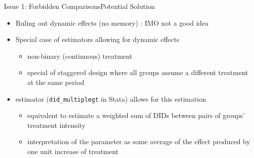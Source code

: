\documentclass{beamer}
\begin{document}
\begin{frame}{Issue 1: Forbidden Comparisons}{Potential Solution}
    

    \begin{itemize}
        \item Ruling out dynamic effects (no memory) \citep[][with quasi-stayers]{bib:dechaisemartin2022}: IMO not a good idea

        \item Special case of estimators allowing for dynamic effects %

        \begin{itemize}
            \item non-binary (continuous) treatment
            \item special of staggered design where all groups assume a different treatment at the same period
        \end{itemize}

        \item \citet{bib:dechaisemartin2021} estimator (\texttt{did\_multiplegt} in Stata) allows for this estimation

        \begin{itemize}
            \item equivalent to estimate a weighted sum of DIDs between pairs of groups' treatment intensity
            \item interpretation of the parameter as some average of the effect produced by one unit increase of treatment 
        \end{itemize}

    \end{itemize}

\end{frame}

\end{document}
